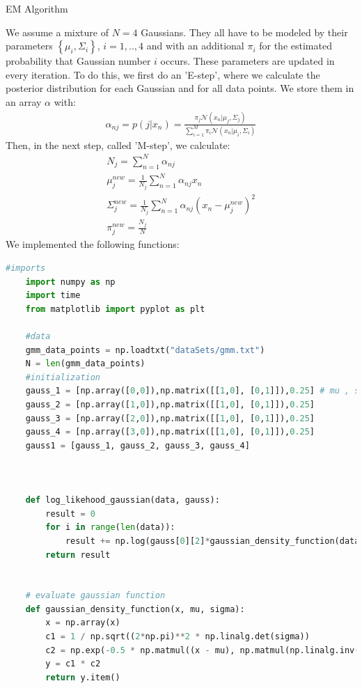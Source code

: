 \documentclass[
ngerman,
]{tudaexercise}
\begin{document}
\begin{task}{EM Algorithm}
\begin{subtask} We assume a mixture of $N=4$ Gaussians. They all have to be modeled by their parameters $\left\lbrace \mu_i , \Sigma_i\right\rbrace$, $i=1,..,4$ and with an additional $\pi_i$ for the estimated probability that Gaussian number $i$ occurs. These parameters are updated in every iteration. To do this, we first do an 'E-step', where we calculate the posterior distribution for each Gaussian and for all data points. We store them in an array $\alpha$ with: \begin{align*}
	\alpha_{nj}=p(j|x_n)=\frac{\pi_j \mathcal{N}\left( x_n|\mu_j,\Sigma_j\right) }{\sum_{i=1}^{M}\pi_i \mathcal{N}\left( x_n|\mu_i,\Sigma_i\right)}
	\end{align*}
Then, in the next step, called 'M-step', we calculate:\begin{align*}N_j=\sum_{n=1}^{N}\alpha_{nj}\\ \mu_j^{new}=\frac{1}{N_j}\sum_{n=1}^{N}\alpha_{nj}x_n\\
\Sigma_j^{new}=\frac{1}{N_j}\sum_{n=1}^{N}\alpha_{nj}\left( x_n-\mu_j^{new}\right) ^2\\
\pi_j^{new}=\frac{N_j}{N}
\end{align*}
We implemented the following functions:
\begin{lstlisting}[language=Python]
	#imports
	import numpy as np
	import time
	from matplotlib import pyplot as plt
	
	#data
	gmm_data_points = np.loadtxt("dataSets/gmm.txt")
	N = len(gmm_data_points)
	#initialization
	gauss_1 = [np.array([0,0]),np.matrix([[1,0], [0,1]]),0.25] # mu , sigma, pi
	gauss_2 = [np.array([1,0]),np.matrix([[1,0], [0,1]]),0.25]
	gauss_3 = [np.array([2,0]),np.matrix([[1,0], [0,1]]),0.25]
	gauss_4 = [np.array([3,0]),np.matrix([[1,0], [0,1]]),0.25]
	gauss1 = [gauss_1, gauss_2, gauss_3, gauss_4]
	
	
	
	def log_likehood_gaussian(data, gauss):
		result = 0
		for i in range(len(data)):
			result += np.log(gauss[0][2]*gaussian_density_function(data[i], gauss[0][0], gauss[0][1]) + gauss[1][2]*gaussian_density_function(data[i], gauss[1][0], gauss[1][1]) + gauss[2][2]*gaussian_density_function(data[i], gauss[2][0], gauss[2][1]) + gauss[3][2]*gaussian_density_function(data[i], gauss[3][0], gauss[3][1]))
		return result
	
	
	# evaluate gaussian function
	def gaussian_density_function(x, mu, sigma):
		x = np.array(x)
		c1 = 1 / np.sqrt((2*np.pi)**2 * np.linalg.det(sigma))
		c2 = np.exp(-0.5 * np.matmul((x - mu), np.matmul(np.linalg.inv(sigma),(x - mu)).T))
		y = c1 * c2
		return y.item()
		

\end{lstlisting}
\end{subtask}
\end{task}
\end{document}
